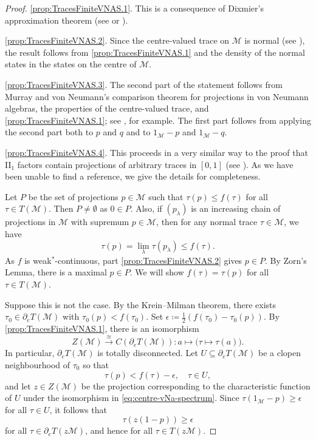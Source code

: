 \documentclass[a4paper,11pt]{amsart}
\theoremstyle{definition}
\numberwithin{equation}{section}
\numberwithin{theorem}{section}
\newcommand{\M}{\mathcal{M}}
\begin{document}
\begin{proof}
\ref{prop:TracesFiniteVNAS.1}.  This is a consequence of Dixmier's approximation theorem (see \cite[Proposition 8.3.10]{KadisonRingrose.2} or \cite[Theorem~III.2.5.7(iv)]{Bl06}).

\ref{prop:TracesFiniteVNAS.2}.  Since the centre-valued trace on $\M$ is normal (see \cite[Theorem~V.2.34]{Ta79}), the result follows from \ref{prop:TracesFiniteVNAS.1} and the density of the normal states in the states on the centre of $\mathcal M$.

\ref{prop:TracesFiniteVNAS.3}. The second part of the statement follows from Murray and von Neumann's comparison theorem for projections in von Neumann algebras, the properties of the centre-valued trace, and \ref{prop:TracesFiniteVNAS.1}; see \cite[Corollary V.2.8]{Tak79}, for example.  The first part follows from applying the second part both to $p$ and $q$ and to $1_{\mathcal M}-p$ and $1_{\mathcal M}-q$.

\ref{prop:TracesFiniteVNAS.4}. This proceeds in a very similar way to the proof that II$_1$ factors contain projections of arbitrary traces in $[0,1]$ (see \cite[Proposition 4.1.6]{PA}). As we have been unable to find a reference, we give the details for completeness. 

Let $P$ be the set of projections $p \in \mathcal M$ such that $\tau(p) \leq f(\tau)$ for all $\tau \in T(\mathcal M)$.  Then $P \neq \emptyset$ as $0 \in P$.  Also, if $(p_\lambda)$ is an increasing chain of projections in $\M$ with supremum $p \in \M$, then for any normal trace $\tau\in\mathcal M$, we have
	\begin{equation}
		\tau(p) = \lim_\lambda \tau(p_\lambda) \leq f(\tau).
	\end{equation}
 As $f$ is weak$^*$-continuous, part \ref{prop:TracesFiniteVNAS.2} gives $p \in P$.  By Zorn's Lemma, there is a maximal $p \in P$.  We will show $f(\tau) = \tau(p)$ for all $\tau \in T(\M)$.
	
	Suppose this is not the case.  By the Krein--Milman theorem, there exists $\tau_0 \in \partial_e T(\M)$ with $\tau_0(p) < f(\tau_0)$.
	Set $\epsilon \coloneqq \frac{1}{2}(f(\tau_0) - \tau_0(p))$. By \ref{prop:TracesFiniteVNAS.1}, there is an isomorphism \begin{equation}\label{eq:centre-vNa-spectrum}
		Z(\M) \overset\cong\longrightarrow C(\partial_e T(\M)) \colon a \mapsto \big(\tau \mapsto \tau(a)\big).
	\end{equation}
	In particular, $\partial_e T(\M)$ is totally disconnected.  Let $U \subseteq \partial_e T(\M)$ be a clopen neighbourhood of $\tau_0$ so that 
	\begin{equation}
		\tau(p) < f(\tau) - \epsilon, \quad \tau \in U,
	\end{equation}
    and let $z \in Z(\M)$ be the projection corresponding to the characteristic function of $U$ under the isomorphism in \eqref{eq:centre-vNa-spectrum}. 
	Since $\tau(1_\M-p) \geq \epsilon$ for all $\tau \in U$, it follows that 
	\begin{equation}
		\tau(z(1-p)) \geq \epsilon  
	\end{equation}
	for all $\tau \in \partial_e T(z\M)$, and hence for all $\tau \in T(z\M)$.
	

\end{proof}
\end{document}
